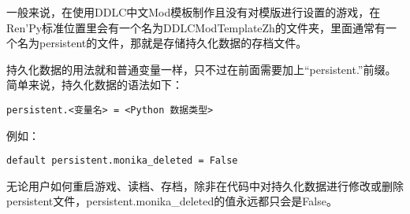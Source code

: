 \documentclass[../../Main.tex]{subfiles}
\begin{document}
一般来说，在使用DDLC中文Mod模板制作且没有对模版进行设置的游戏，在Ren'Py标准位置里会有一个名为DDLCModTemplateZh的文件夹，里面通常有一个名为persistent的文件，那就是存储持久化数据的存档文件。

持久化数据的用法就和普通变量一样，只不过在前面需要加上“persistent.”前缀。简单来说，持久化数据的语法如下：

\begin{lstlisting}
persistent.<变量名> = <Python 数据类型>
\end{lstlisting}

例如：
\begin{lstlisting}
default persistent.monika_deleted = False
\end{lstlisting}

无论用户如何重启游戏、读档、存档，除非在代码中对持久化数据进行修改或删除persistent文件，persistent.monika\_deleted的值永远都只会是False。
\end{document}
